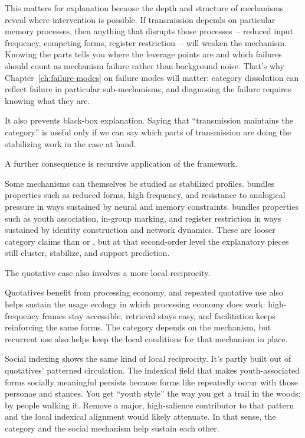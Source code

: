 This matters for explanation because the depth and structure of mechanisms reveal where intervention is possible. If transmission depends on particular memory processes, then anything that disrupts those processes~-- reduced input frequency, competing forms, register restriction~-- will weaken the mechanism. Knowing the parts tells you where the leverage points are and which failures should count as mechanism failure rather than background noise. That's why Chapter~\ref{ch:failure-modes} on failure modes will matter: category dissolution can reflect failure in particular sub-mechanisms, and diagnosing the failure requires knowing what they are.

It also prevents black-box explanation. Saying that \enquote{transmission maintains the category} is useful only if we can say which parts of transmission are doing the stabilizing work in the case at hand.

A further consequence is recursive application of the framework.

Some mechanisms can themselves be studied as stabilized profiles.  bundles properties such as reduced forms, high frequency, and resistance to analogical pressure in ways sustained by neural and memory constraints.  bundles properties such as youth association, in-group marking, and register restriction in ways sustained by identity construction and network dynamics. These are looser category claims than  or , but at that second-order level the explanatory pieces still cluster, stabilize, and support prediction.

The quotative case also involves a more local reciprocity.

Quotatives benefit from processing economy, and repeated quotative use also helps sustain the usage ecology in which processing economy does work: high-frequency frames stay accessible, retrieval stays easy, and facilitation keeps reinforcing the same forms. The category depends on the mechanism, but recurrent use also helps keep the local conditions for that mechanism in place.

Social indexing shows the same kind of local reciprocity. It's partly built out of quotatives' patterned circulation. The indexical field that makes youth-associated forms socially meaningful persists because forms like  repeatedly occur with those personae and stances. You get \enquote{youth style} the way you get a trail in the woods: by people walking it. Remove a major, high-salience contributor to that pattern and the local indexical alignment would likely attenuate. In that sense, the category and the social mechanism help sustain each other.

